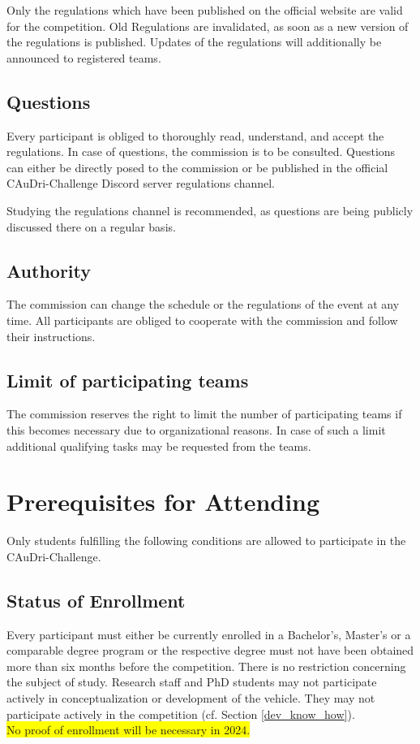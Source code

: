 \documentclass[a4paper]{report}
\begin{document}
Only the regulations which have been published on the official website are valid for the competition. Old Regulations are invalidated, as soon as a new version of the regulations is published. Updates of the regulations will additionally be announced to registered teams. 

\section{Questions}

Every participant is obliged to thoroughly read, understand, and accept the regulations. In case of questions, the commission is to be consulted. Questions can either be directly posed to the commission or be published in the official CAuDri-Challenge Discord server regulations channel. 

Studying the regulations channel is recommended, as questions are being publicly discussed there on a regular basis. 

\section{Authority}

The commission can change the schedule or the regulations of the event at any time. All participants are obliged to cooperate with the commission and follow their instructions. 

\section{Limit of participating teams}

The commission reserves the right to limit the number of participating teams if this becomes necessary due to organizational reasons. In case of such a limit additional qualifying tasks may be requested from the teams. 


\chapter{Prerequisites for Attending}

Only students fulfilling the following conditions are allowed to participate in the CAuDri-Challenge. 

\section{Status of Enrollment}

Every participant must either be currently enrolled in a Bachelor’s, Master’s or a comparable degree program or the respective degree must not have been obtained more than six months before the competition. There is no restriction concerning the subject of study. Research staff and PhD students may not participate actively in conceptualization or development of the vehicle. They may not participate actively in the competition (cf. Section \ref{dev_know_how}).\\
{\colorbox{yellow}{No proof of enrollment will be necessary in 2024.}}
\end{document}
